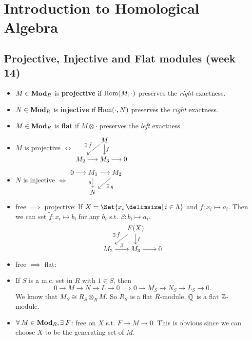 \section{Introduction to Homological Algebra}

\subsection{Projective, Injective and Flat modules (week 14)}

\begin{definition} \mbox{}
  \begin{itemize}
    \item $M \in \mathbf{Mod}_R$ is {\bf projective} if $\operatorname{Hom}(M, \cdot)$ preserves the
      {\it right} exactness.
    \item $N \in \mathbf{Mod}_R$ is {\bf injective} if $\operatorname{Hom}(\cdot, N)$ preserves the
      {\it right} exactness.
    \item $M \in \mathbf{Mod}_R$ is {\bf flat} if $M\otimes \cdot$ preserves the
      {\it left} exactness.
  \end{itemize}
\end{definition}

\begin{fact} \mbox{}
  \begin{itemize}
    \item $M$ is projective $\iff$
      $\begin{tikzcd}[cramped, sep=15pt]
         & M \ar[dl, "\exists \tilde f"'] \ar[d, "f"] \\
        M_2 \ar[r] & M_3 \ar[r] & 0
      \end{tikzcd}$
    \item $N$ is injective $\iff$
      $\begin{tikzcd}[cramped, sep=15pt]
        0 \ar[r] & M_1 \ar[d, "g"'] \ar[r] & M_2 \ar[dl, "\exists \tilde g"] \\
         & N
      \end{tikzcd}$
    \item free $\implies$ projective:
      If $X = \Set{ x_i \given i \in \Lambda}$ and $f: x_i \mapsto a_i$. Then
      we can set $\tilde f: x_i \mapsto b_i$ for any $b_i$ s.t.
      $\beta: b_i \mapsto a_i$.
      \[\begin{tikzcd}[cramped, sep=15pt]
        & F(X) \ar[dl, "\exists \tilde f"'] \ar[d, "f"] \\
        M_2 \ar[r, "\beta"] & M_3 \ar[r] & 0
      \end{tikzcd}\]
    \item free $\implies$ flat:
    \item If $S$ is a m.c. set in $R$ with $1 \in S$, then
      \[ 0 \to M \to N \to L \to 0 \implies 0 \to M_S \to N_S \to L_S \to 0. \]
      We know that $M_S \cong R_S \otimes_R M$. So $R_S$ is a flat $R$-module.
      $\mathbb{Q}$ is a flat $\mathbb{Z}$-module.
    \item $\forall M \in \Mod_R, \exists F$: free on $X$ s.t. $F \to M \to 0$.
      This is obvious since we can choose $X$ to be the generating set of $M$.
  \end{itemize}
\end{fact}

